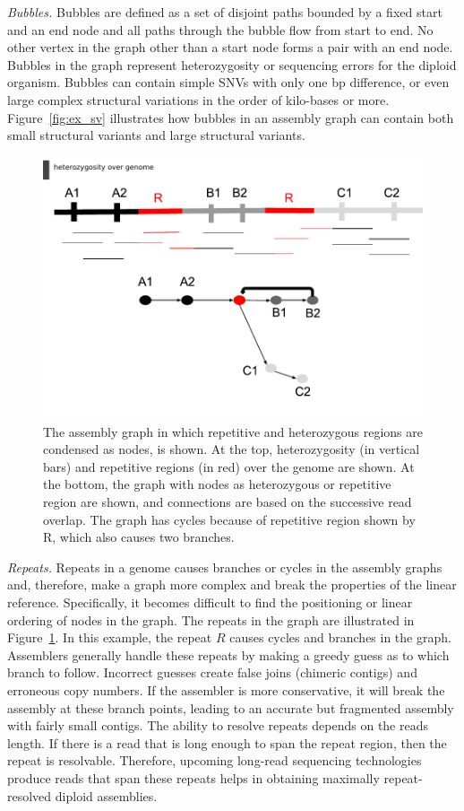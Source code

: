 \textit{Bubbles.}
Bubbles are defined as a set of disjoint paths bounded by a fixed start and an end node and all paths through the bubble flow from start to end. 
No other vertex in the graph other than a start node forms a pair with an end node.
Bubbles in the graph represent heterozygosity or sequencing errors for the diploid organism.
Bubbles can contain simple SNVs with only one bp difference, or even large complex structural variations in the order of kilo-bases or more.  
Figure~\ref{fig:ex_sv} illustrates how bubbles in an assembly graph can contain both small structural variants and large structural variants.
\begin{figure}[t!]\centering
\includegraphics[width=\columnwidth]{repeats.pdf}
\caption{The assembly graph in which repetitive and heterozygous regions are condensed as nodes, is shown. 
At the top, heterozygosity (in vertical bars) and repetitive regions (in red) over the genome are shown. 
At the bottom, the graph with nodes as heterozygous or repetitive region are shown, and connections are based on the successive read overlap.
The graph has cycles because of repetitive region shown by R, which also causes two branches.}
\label{fig:repeats}
\end{figure}

\textit{Repeats.} Repeats in a genome causes branches or cycles in the assembly graphs and, therefore, make a graph more complex and break the properties of the linear reference.
Specifically, it becomes difficult to find the positioning or linear ordering of nodes in the graph.
The repeats in the graph are illustrated in Figure~\ref{fig:repeats}. In this example, the repeat $R$ causes cycles and branches in the graph.
Assemblers generally handle these repeats by making a greedy guess as to which branch to follow.
Incorrect guesses create false joins (chimeric contigs) and erroneous copy numbers. 
If the assembler is more conservative, it will break the assembly at these branch points, leading to an accurate but fragmented assembly with fairly small contigs.
The ability to resolve repeats depends on the reads length. If there is a read that is long enough to span the repeat region, then the repeat is resolvable.
Therefore, upcoming long-read sequencing technologies produce reads that span these repeats helps in obtaining maximally repeat-resolved diploid assemblies.

